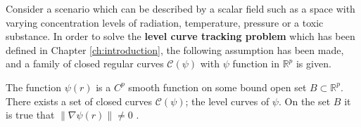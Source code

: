 Consider a scenario which can be described by a scalar field such as a space with varying concentration levels of radiation,  temperature, pressure or a toxic substance. 
%
%
%
In order to solve the \textbf{level curve tracking problem} which has been defined in Chapter \ref{ch:introduction}, the following assumption has been made, and a family of closed regular curves $\mathcal{C}(\psi)$ with $\psi$ function in $\mathbb{R}^p$ is given.
 
\begin{assumption}\label{as:clc}
The function $\psi(r)$ is a $C^p$ smooth function on some bound open set $B \subset \mathbb{R}^p$. There exists a set of closed curves $\mathcal{C}(\psi)$; the level curves of $\psi$. On the set $B$ it is true that $\|\nabla \psi(r)\|\neq 0$ \citep{ZhangLeonard06, WilliamsSukhatme12}.
\end{assumption}


